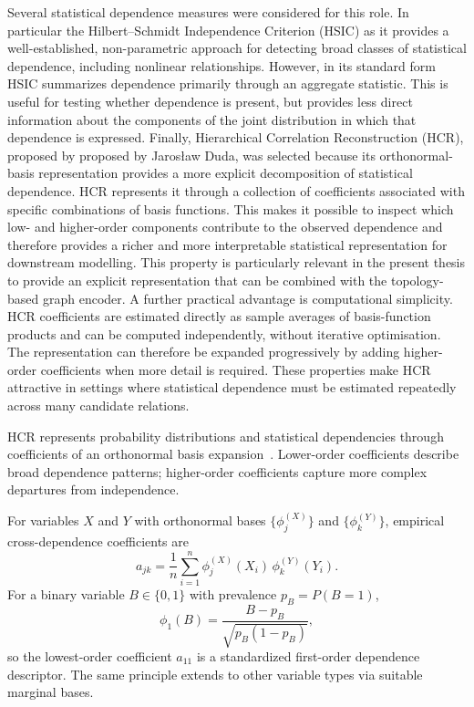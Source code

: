 Several statistical dependence measures were considered for this role. 
In particular the Hilbert–Schmidt Independence Criterion (HSIC) as it provides a well-established, 
non-parametric approach for detecting broad classes of statistical dependence, 
including nonlinear relationships. However, in its standard form HSIC summarizes 
dependence primarily through an aggregate statistic. This is useful for testing 
whether dependence is present, but provides less direct information about the components 
of the joint distribution in which that dependence is expressed.
Finally, Hierarchical Correlation Reconstruction (HCR), proposed by proposed by Jaros\l{}aw Duda,
 was selected because its orthonormal-basis representation provides a more explicit 
decomposition of statistical dependence. HCR represents it through a collection of coefficients 
associated with specific combinations of basis functions. This makes it possible to inspect which 
low- and higher-order components contribute to the observed dependence and therefore provides 
a richer and more interpretable statistical representation for downstream modelling. This property 
is particularly relevant in the present thesis to provide an explicit representation 
that can be combined with the topology-based graph encoder.
A further practical advantage is computational simplicity. 
HCR coefficients are estimated directly as sample averages of basis-function products and can 
be computed independently, without iterative optimisation. The representation can therefore be 
expanded progressively by adding higher-order coefficients when more detail is required. 
These properties make HCR attractive in settings where statistical dependence must be estimated 
repeatedly across many candidate relations.

HCR represents probability distributions and statistical dependencies through coefficients of an orthonormal basis expansion~\cite{duda2018hcr,duda2018hcr-ts,duda2020hcr-income,duda2023hcr-wolfram,duda2025hcr-mi}.
Lower-order coefficients describe broad dependence patterns; higher-order coefficients capture more complex departures from independence.

For variables $X$ and $Y$ with orthonormal bases $\{\phi_j^{(X)}\}$ and $\{\phi_k^{(Y)}\}$, empirical cross-dependence coefficients are
\begin{equation}
a_{jk}
=
\frac{1}{n}
\sum_{i=1}^{n}
\phi_j^{(X)}(X_i)\,
\phi_k^{(Y)}(Y_i).
\end{equation}
For a binary variable $B\in\{0,1\}$ with prevalence $p_B=P(B=1)$,
\begin{equation}
\phi_1(B)=\frac{B-p_B}{\sqrt{p_B(1-p_B)}},
\end{equation}
so the lowest-order coefficient $a_{11}$ is a standardized first-order dependence descriptor.
The same principle extends to other variable types via suitable marginal bases.

